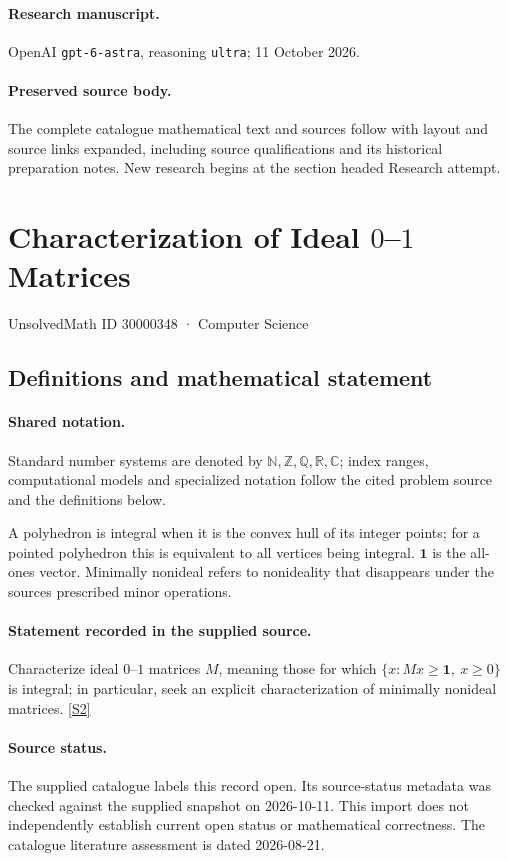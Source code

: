 \documentclass[11pt]{article}
\begin{document}
\paragraph{Research manuscript.} OpenAI \texttt{gpt-6-astra}, reasoning \texttt{ultra}; 11 October 2026.
\paragraph{Preserved source body.} The complete catalogue mathematical text and sources follow with layout and source links expanded, including source qualifications and its historical preparation notes. New research begins at the section headed Research attempt.

\section{Characterization of Ideal $0$–$1$ Matrices}\label{30000348}
{\small UnsolvedMath ID 30000348 · Computer Science}
\subsection{Definitions and mathematical statement}

\paragraph{Shared notation.}Standard number systems are denoted by $\mathbb N,\mathbb Z,\mathbb Q,\mathbb R,\mathbb C$; index ranges, computational models and specialized notation follow the cited problem source and the definitions below.


A polyhedron is integral when it is the convex hull of its integer points; for a pointed polyhedron this is equivalent to all vertices being integral. $\mathbf1$ is the all-ones vector. Minimally nonideal refers to nonideality that disappears under the source\textquotesingle s prescribed minor operations.
\paragraph{Statement recorded in the supplied source.}
Characterize ideal $0$–$1$ matrices $M$, meaning those for which $\{x:Mx\geq\mathbf1,\ x\geq0\}$ is integral; in particular, seek an explicit characterization of minimally nonideal matrices. \href{https://doi.org/10.4171/owr/2005/50}{[S2]}
\paragraph{Source status.}
The supplied catalogue labels this record open. Its source-status metadata was checked against the supplied snapshot on 2026-10-11. This import does not independently establish current open status or mathematical correctness. The catalogue literature assessment is dated 2026-08-21.
\end{document}
